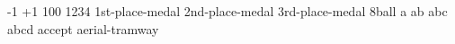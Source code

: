 \documentclass{article}
\begin{document}
-1               
+1               
100              
1234             
1st-place-medal  
2nd-place-medal  
3rd-place-medal  
8ball            
a                
ab               
abc              
abcd             
accept           
aerial-tramway   
\end{document}

